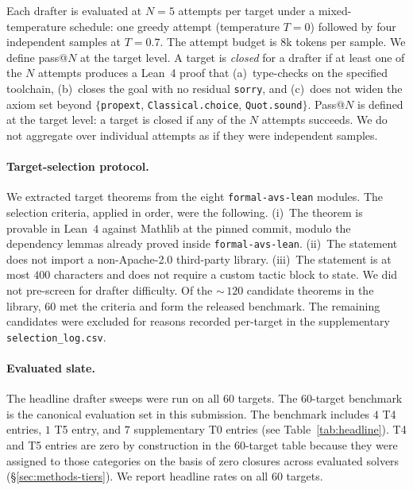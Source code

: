Each drafter is evaluated at $N=5$ attempts per target under a
mixed-temperature schedule: one greedy attempt (temperature
$T=0$) followed by four independent samples at $T=0.7$. The
attempt budget is $8$k tokens per sample. We define pass@$N$ at
the target level. A target is \emph{closed} for a drafter if at
least one of the $N$ attempts produces a Lean~4 proof that
(a)~type-checks on the specified toolchain, (b)~closes the goal
with no residual \texttt{sorry}, and (c)~does not widen the
axiom set beyond $\{$\texttt{propext}, \texttt{Classical.choice}, \texttt{Quot.sound}$\}$.
Pass@$N$ is defined at the target level: a target is closed if any
of the $N$ attempts succeeds. We do not aggregate over individual
attempts as if they were independent samples.

\paragraph{Target-selection protocol.}
We extracted target theorems from the eight
\texttt{formal-avs-lean} modules. The selection criteria,
applied in order, were the following.
(i)~The theorem is provable in Lean~$4$ against Mathlib at the
pinned commit, modulo the dependency lemmas already proved
inside \texttt{formal-avs-lean}.
(ii)~The statement does not import a non-Apache-2.0 third-party
library.
(iii)~The statement is at most $400$ characters and does not
require a custom tactic block to state.
We did not pre-screen for drafter difficulty. Of the
$\sim$\,$120$ candidate theorems in the library, $60$ met the
criteria and form the released benchmark. The remaining
candidates were excluded for reasons recorded per-target in the
supplementary \texttt{selection\_log.csv}.

\paragraph{Evaluated slate.}
The headline drafter sweeps were run on all $60$ targets.
The $60$-target benchmark is the canonical evaluation set in this
submission. The benchmark includes $4$ T4 entries,
$1$ T5 entry, and $7$ supplementary T0 entries
(see Table~\ref{tab:headline}).
T4 and T5 entries are zero by construction in the
$60$-target table because they were assigned to those
categories on the basis of zero closures across evaluated
solvers (\S\ref{sec:methods-tiers}). We report headline rates on all $60$ targets.

